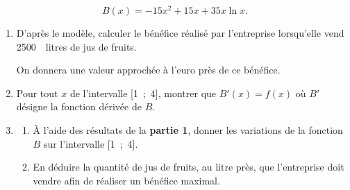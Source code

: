 \documentclass[10pt]{article}
\providecommand{\np}[2][]{{#2~#1}}
\begin{document}
\[B(x) = - 15x^2 + 15x +35x \ln x.\]

\begin{enumerate}
\item D'après le modèle, calculer le bénéfice réalisé par l'entreprise lorsqu'elle vend \np{2500}~litres de jus de fruits.

On donnera une valeur approchée à l'euro près de ce bénéfice.
\item Pour tout $x$ de l'intervalle [1~;~4], montrer que $B'(x) = f(x)$ où $B'$ désigne la fonction dérivée de $B$.
\item 
	\begin{enumerate}
		\item À l'aide des résultats de la \textbf{partie 1}, donner les variations de la fonction $B$ sur l'intervalle [1~;~4].
		\item En déduire la quantité de jus de fruits, au litre près, que l'entreprise doit vendre afin de réaliser un bénéfice maximal.
	\end{enumerate}
\end{enumerate}
\end{document}
